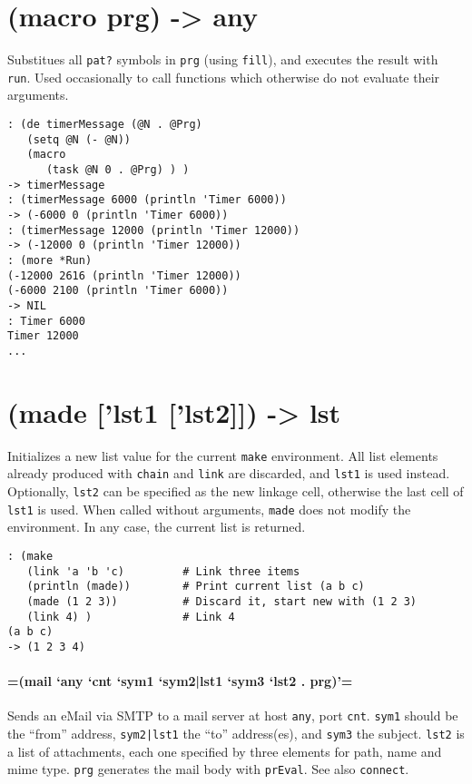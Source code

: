 {{{{{{{ 
\section{(macro prg) -> any}
\label{sec-8-1-13-3}


Substitues all \texttt{pat?} symbols in \texttt{prg} (using \texttt{fill}), and executes the
result with \texttt{run}. Used occasionally to call functions which otherwise
do not evaluate their arguments.


\begin{verbatim}
: (de timerMessage (@N . @Prg)
   (setq @N (- @N))
   (macro
      (task @N 0 . @Prg) ) )
-> timerMessage
: (timerMessage 6000 (println 'Timer 6000))
-> (-6000 0 (println 'Timer 6000))
: (timerMessage 12000 (println 'Timer 12000))
-> (-12000 0 (println 'Timer 12000))
: (more *Run)
(-12000 2616 (println 'Timer 12000))
(-6000 2100 (println 'Timer 6000))
-> NIL
: Timer 6000
Timer 12000
...
\end{verbatim}

 
\section{(made ['lst1 ['lst2]]) -> lst}
\label{sec-8-1-13-4}


Initializes a new list value for the current \texttt{make} environment. All
list elements already produced with \texttt{chain} and \texttt{link} are discarded,
and \texttt{lst1} is used instead. Optionally, \texttt{lst2} can be specified as the
new linkage cell, otherwise the last cell of \texttt{lst1} is used. When called
without arguments, \texttt{made} does not modify the environment. In any case,
the current list is returned.


\begin{verbatim}
: (make
   (link 'a 'b 'c)         # Link three items
   (println (made))        # Print current list (a b c)
   (made (1 2 3))          # Discard it, start new with (1 2 3)
   (link 4) )              # Link 4
(a b c)
-> (1 2 3 4)
\end{verbatim}

 
\paragraph{=(mail `any `cnt `sym1 `sym2|lst1 `sym3 `lst2 . prg)'=}
\label{sec-8-1-13-5}


Sends an eMail via SMTP to a mail server at host \texttt{any}, port \texttt{cnt}.
\texttt{sym1} should be the ``from'' address, \texttt{sym2|lst1} the ``to'' address(es),
and \texttt{sym3} the subject. \texttt{lst2} is a list of attachments, each one
specified by three elements for path, name and mime type. \texttt{prg}
generates the mail body with \texttt{prEval}. See also \texttt{connect}.


}}}}}}}
